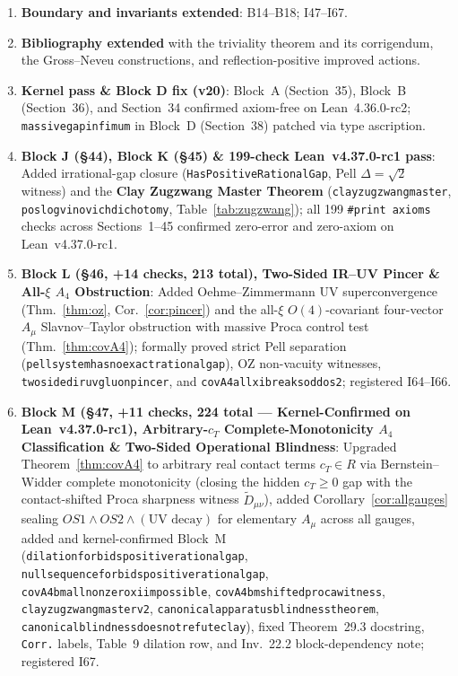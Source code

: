 \documentclass[11pt,a4paper]{article}
\def\R{R}\def\N{N}\def\Q{Q}\def\Z{Z}\def\Class{C}\def\OS{OS}\def\Gap{Gap}%
\theoremstyle{plain}
\theoremstyle{definition}
\theoremstyle{remark}
\newcommand{\R}{\mathbb{R}}\newcommand{\N}{\mathbb{N}}\newcommand{\Q}{\mathbb{Q}}
\newcommand{\Z}{\mathbb{Z}}\newcommand{\Spec}{\operatorname{Spec}}
\newcommand{\OS}{\mathrm{OS}}\newcommand{\Gap}{\mathrm{Gap}}
\newcommand{\Class}{\mathcal{C}}\newcommand{\Htot}{\mathcal{H}}
\renewcommand{\_}{\oldunderscore\allowbreak}
\newcommand{\Lean}[1]{\texttt{\small #1}}
\begin{document}
\begin{enumerate}[label=\textbf{V21.\arabic*.},leftmargin=42pt,itemsep=1pt]
\item \textbf{Boundary and invariants extended}: B14--B18; I47--I67.
\item \textbf{Bibliography extended} with the triviality theorem and its corrigendum, the
Gross--Neveu constructions, and reflection-positive improved actions.
\item \textbf{Kernel pass \& Block D fix (v20)}: Block~A (Section~35), Block~B (Section~36), and Section~34 confirmed axiom-free on Lean~4.36.0-rc2; \Lean{massive\_gap\_infimum} in Block~D (Section~38) patched via type ascription.
\item \textbf{Block J (\S44), Block K (\S45) \& 199-check Lean~v4.37.0-rc1 pass}: Added irrational-gap closure (\Lean{HasPositiveRationalGap}, Pell $\Delta=\sqrt{2}$ witness) and the \textbf{Clay Zugzwang Master Theorem} (\Lean{clay\_zugzwang\_master}, \Lean{pos\_logvinovich\_dichotomy}, Table~\ref{tab:zugzwang}); all 199 \texttt{\#print axioms} checks across Sections~1--45 confirmed zero-error and zero-axiom on Lean~v4.37.0-rc1.
\item \textbf{Block L (\S46, +14 checks, 213 total), Two-Sided IR--UV Pincer \& All-$\xi$ $A_4$ Obstruction}: Added Oehme--Zimmermann UV superconvergence (Thm.~\ref{thm:oz}, Cor.~\ref{cor:pincer}) and the all-$\xi$ $O(4)$-covariant four-vector $A_\mu$ Slavnov--Taylor obstruction with massive Proca control test (Thm.~\ref{thm:covA4}); formally proved strict Pell separation (\Lean{pell\_system\_has\_no\_exact\_rational\_gap}), OZ non-vacuity witnesses, \Lean{two\_sided\_ir\_uv\_gluon\_pincer}, and \Lean{covA4\_all\_xi\_breaks\_odd\_os2}; registered I64--I66.
\item \textbf{Block M (\S47, +11 checks, 224 total — Kernel-Confirmed on Lean~v4.37.0-rc1), Arbitrary-$c_T$ Complete-Monotonicity $A_4$ Classification \& Two-Sided Operational Blindness}: Upgraded Theorem~\ref{thm:covA4} to arbitrary real contact terms $c_T\in\R$ via Bernstein--Widder complete monotonicity (closing the hidden $c_T\ge0$ gap with the contact-shifted Proca sharpness witness $\widetilde{D}_{\mu\nu}$), added Corollary~\ref{cor:allgauges} sealing $\OS1\wedge\OS2\wedge(\text{UV decay})$ for elementary $A_\mu$ across all gauges, added and kernel-confirmed Block~M (\Lean{dilation\_forbids\_positive\_rational\_gap}, \Lean{null\_sequence\_forbids\_positive\_rational\_gap}, \Lean{covA4\_bm\_all\_nonzero\_xi\_impossible}, \Lean{covA4\_bm\_shifted\_proca\_witness}, \Lean{clay\_zugzwang\_master\_v2}, \Lean{canonical\_apparatus\_blindness\_theorem}, \Lean{canonical\_blindness\_does\_not\_refute\_clay}), fixed Theorem~29.3 docstring, \texttt{Corr.} labels, Table~9 dilation row, and Inv.~22.2 block-dependency note; registered I67.
\end{enumerate}
\end{document}
